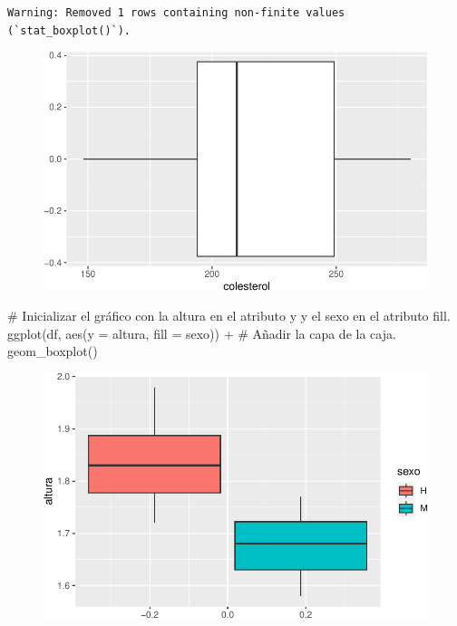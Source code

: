 \documentclass[
  a4paper,
]{scrreport}
\newenvironment{Shaded}{\begin{snugshade}}{\end{snugshade}}
\newcommand{\AttributeTok}[1]{\textcolor[rgb]{0.40,0.45,0.13}{#1}}
\newcommand{\CommentTok}[1]{\textcolor[rgb]{0.37,0.37,0.37}{#1}}
\newcommand{\FunctionTok}[1]{\textcolor[rgb]{0.28,0.35,0.67}{#1}}
\newcommand{\NormalTok}[1]{\textcolor[rgb]{0.00,0.23,0.31}{#1}}
\newcommand{\SpecialCharTok}[1]{\textcolor[rgb]{0.37,0.37,0.37}{#1}}
\theoremstyle{definition}
\theoremstyle{definition}
\theoremstyle{remark}
\begin{document}
\begin{verbatim}
Warning: Removed 1 rows containing non-finite values (`stat_boxplot()`).
\end{verbatim}

\begin{figure}[H]

{\centering \includegraphics{07-graficos_files/figure-pdf/unnamed-chunk-21-1.pdf}

}

\end{figure}

\begin{Shaded}
\begin{Highlighting}[]
\CommentTok{\# Inicializar el gráfico con la altura en el atributo y y el sexo en el atributo fill.}
\FunctionTok{ggplot}\NormalTok{(df, }\FunctionTok{aes}\NormalTok{(}\AttributeTok{y =}\NormalTok{ altura, }\AttributeTok{fill =}\NormalTok{ sexo)) }\SpecialCharTok{+}
\CommentTok{\# Añadir la capa de la caja.}
    \FunctionTok{geom\_boxplot}\NormalTok{()}
\end{Highlighting}
\end{Shaded}

\begin{figure}[H]

{\centering \includegraphics{07-graficos_files/figure-pdf/unnamed-chunk-22-1.pdf}

}

\end{figure}
\end{document}
